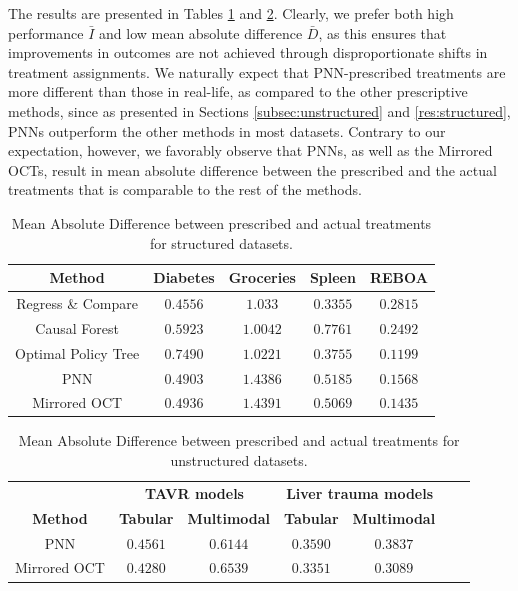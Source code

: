 \documentclass[10pt]{article} %
\begin{document}
The results are presented in Tables \ref{structured-mad} and \ref{unstructured-mad}. Clearly, we prefer both high performance $\bar{I}$ and low mean absolute difference $\bar{D}$, as this ensures that improvements in outcomes are not achieved through disproportionate shifts in treatment assignments. We naturally expect that PNN-prescribed treatments are more different than those in real-life, as compared to the other prescriptive methods, since as presented in Sections \ref{subsec:unstructured} and \ref{res:structured}, PNNs outperform the other methods in most datasets. Contrary to our expectation, however, we favorably observe that PNNs, as well as the Mirrored OCTs, result in mean absolute difference between the prescribed and the actual treatments that is comparable to the rest of the methods.

\begin{table}[ht]\caption{Mean Absolute Difference between prescribed and actual treatments for structured datasets.}\label{structured-mad}
\begin{center}
\begin{tabular}{ccccc}
\textbf{Method} & \textbf{Diabetes} & \textbf{Groceries} & \textbf{Spleen} & \textbf{REBOA} \\ \midrule
Regress \& Compare & $\mathbf{0.4556}$ & $1.033$ & $\mathbf{0.3355}$ &  $0.2815$ \\ 
Causal Forest & $0.5923$& $\mathbf{1.0042}$ & $ 0.7761$ & $0.2492$\\ 
Optimal Policy Tree & $0.7490$&$1.0221$ & $0.3755$ &  $\mathbf{0.1199}$\\ 
PNN & $0.4903$ & $1.4386$ & $0.5185$ &  $0.1568$\\ 
Mirrored OCT & $0.4936$ & $1.4391$ & $0.5069$ &  $0.1435$\\ 
\end{tabular}
\end{center}
\end{table}

\begin{table}[ht]\caption{Mean Absolute Difference between prescribed and actual treatments for unstructured datasets.}\label{unstructured-mad}
\begin{center}
\begin{tabular}{ccccccc}
& \multicolumn{2}{c}{\textbf{TAVR models}} & \multicolumn{2}{c}{\textbf{Liver trauma models}} \\ 
\textbf{Method} & \textbf{Tabular} & \textbf{Multimodal} & \textbf{Tabular} & \textbf{Multimodal} \\ \midrule
PNN & $0.4561$ & $\mathbf{0.6144}$  & $0.3590$ & $0.3837$ \\ 
Mirrored OCT & $\mathbf{0.4280}$ & $0.6539$ & $\mathbf{0.3351}$ & $\mathbf{0.3089}$\\ 
\end{tabular}
\end{center}
\end{table}
\end{document}
